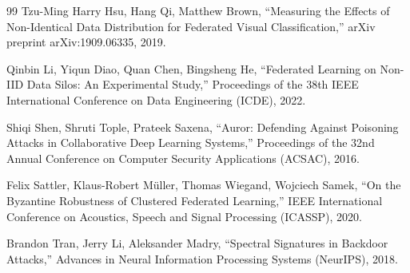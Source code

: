 \documentclass[a4j, twocolumn, dvipdfmx]{jsarticle}
\begin{document}
\begin{thebibliography}{99}
Tzu-Ming Harry Hsu, Hang Qi, Matthew Brown,
``Measuring the Effects of Non-Identical Data Distribution for Federated Visual Classification,''
arXiv preprint arXiv:1909.06335, 2019.

Qinbin Li, Yiqun Diao, Quan Chen, Bingsheng He,
``Federated Learning on Non-IID Data Silos: An Experimental Study,''
Proceedings of the 38th IEEE International Conference on Data Engineering (ICDE), 2022.

Shiqi Shen, Shruti Tople, Prateek Saxena,
``Auror: Defending Against Poisoning Attacks in Collaborative Deep Learning Systems,''
Proceedings of the 32nd Annual Conference on Computer Security Applications (ACSAC), 2016.

Felix Sattler, Klaus-Robert M\"uller, Thomas Wiegand, Wojciech Samek,
``On the Byzantine Robustness of Clustered Federated Learning,''
IEEE International Conference on Acoustics, Speech and Signal Processing (ICASSP), 2020.

Brandon Tran, Jerry Li, Aleksander Madry,
``Spectral Signatures in Backdoor Attacks,''
Advances in Neural Information Processing Systems (NeurIPS), 2018.

\end{thebibliography}
\end{document}
